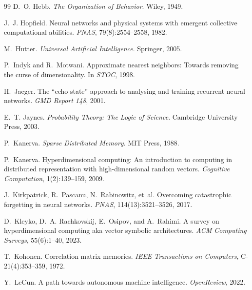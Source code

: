 \documentclass[11pt,a4paper]{article}
\theoremstyle{plain}
\theoremstyle{definition}
\theoremstyle{remark}
\begin{document}
\begin{thebibliography}{99}
D.~O. Hebb.
\newblock \emph{The Organization of Behavior}.
\newblock Wiley, 1949.

J.~J. Hopfield.
\newblock Neural networks and physical systems with emergent collective
computational abilities.
\newblock \emph{PNAS}, 79(8):2554--2558, 1982.

M.~Hutter.
\newblock \emph{Universal Artificial Intelligence}.
\newblock Springer, 2005.

P.~Indyk and R.~Motwani.
\newblock Approximate nearest neighbors: Towards removing the curse of
dimensionality.
\newblock In \emph{STOC}, 1998.

H.~Jaeger.
\newblock The ``echo state'' approach to analysing and training recurrent neural
networks.
\newblock \emph{GMD Report 148}, 2001.

E.~T. Jaynes.
\newblock \emph{Probability Theory: The Logic of Science}.
\newblock Cambridge University Press, 2003.

P.~Kanerva.
\newblock \emph{Sparse Distributed Memory}.
\newblock MIT Press, 1988.

P.~Kanerva.
\newblock Hyperdimensional computing: An introduction to computing in
distributed representation with high-dimensional random vectors.
\newblock \emph{Cognitive Computation}, 1(2):139--159, 2009.

J.~Kirkpatrick, R.~Pascanu, N.~Rabinowitz, et~al.
\newblock Overcoming catastrophic forgetting in neural networks.
\newblock \emph{PNAS}, 114(13):3521--3526, 2017.

D.~Kleyko, D.~A. Rachkovskij, E.~Osipov, and A.~Rahimi.
\newblock A survey on hyperdimensional computing aka vector symbolic
architectures.
\newblock \emph{ACM Computing Surveys}, 55(6):1--40, 2023.

T.~Kohonen.
\newblock Correlation matrix memories.
\newblock \emph{IEEE Transactions on Computers}, C-21(4):353--359, 1972.

Y.~LeCun.
\newblock A path towards autonomous machine intelligence.
\newblock \emph{OpenReview}, 2022.


\end{thebibliography}
\end{document}
